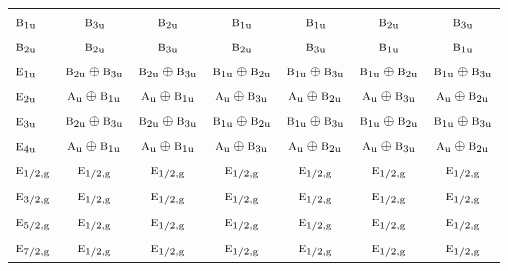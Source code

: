 \documentclass[10pt,a4paper]{article}
\numberwithin{equation}{section}
\newcommand{\irr}[1]{\text{\normalfont\scshape #1}}
\newcommand{\ptag}[1]{\mathrm{#1}}
\begin{document}
{\begin{longtable}{@{}lcccccc@{}}
$\irr{b}_{1\ptag{u}}$ & $\irr{b}_{3\ptag{u}}$ & $\irr{b}_{2\ptag{u}}$ & $\irr{b}_{1\ptag{u}}$ & $\irr{b}_{1\ptag{u}}$ & $\irr{b}_{2\ptag{u}}$ & $\irr{b}_{3\ptag{u}}$\\
$\irr{b}_{2\ptag{u}}$ & $\irr{b}_{2\ptag{u}}$ & $\irr{b}_{3\ptag{u}}$ & $\irr{b}_{2\ptag{u}}$ & $\irr{b}_{3\ptag{u}}$ & $\irr{b}_{1\ptag{u}}$ & $\irr{b}_{1\ptag{u}}$\\
$\irr{e}_{1\ptag{u}}$ & $\irr{b}_{2\ptag{u}}\oplus \irr{b}_{3\ptag{u}}$ & $\irr{b}_{2\ptag{u}}\oplus \irr{b}_{3\ptag{u}}$ & $\irr{b}_{1\ptag{u}}\oplus \irr{b}_{2\ptag{u}}$ & $\irr{b}_{1\ptag{u}}\oplus \irr{b}_{3\ptag{u}}$ & $\irr{b}_{1\ptag{u}}\oplus \irr{b}_{2\ptag{u}}$ & $\irr{b}_{1\ptag{u}}\oplus \irr{b}_{3\ptag{u}}$\\
$\irr{e}_{2\ptag{u}}$ & $\irr{a}_{\ptag{u}}\oplus \irr{b}_{1\ptag{u}}$ & $\irr{a}_{\ptag{u}}\oplus \irr{b}_{1\ptag{u}}$ & $\irr{a}_{\ptag{u}}\oplus \irr{b}_{3\ptag{u}}$ & $\irr{a}_{\ptag{u}}\oplus \irr{b}_{2\ptag{u}}$ & $\irr{a}_{\ptag{u}}\oplus \irr{b}_{3\ptag{u}}$ & $\irr{a}_{\ptag{u}}\oplus \irr{b}_{2\ptag{u}}$\\
$\irr{e}_{3\ptag{u}}$ & $\irr{b}_{2\ptag{u}}\oplus \irr{b}_{3\ptag{u}}$ & $\irr{b}_{2\ptag{u}}\oplus \irr{b}_{3\ptag{u}}$ & $\irr{b}_{1\ptag{u}}\oplus \irr{b}_{2\ptag{u}}$ & $\irr{b}_{1\ptag{u}}\oplus \irr{b}_{3\ptag{u}}$ & $\irr{b}_{1\ptag{u}}\oplus \irr{b}_{2\ptag{u}}$ & $\irr{b}_{1\ptag{u}}\oplus \irr{b}_{3\ptag{u}}$\\
$\irr{e}_{4\ptag{u}}$ & $\irr{a}_{\ptag{u}}\oplus \irr{b}_{1\ptag{u}}$ & $\irr{a}_{\ptag{u}}\oplus \irr{b}_{1\ptag{u}}$ & $\irr{a}_{\ptag{u}}\oplus \irr{b}_{3\ptag{u}}$ & $\irr{a}_{\ptag{u}}\oplus \irr{b}_{2\ptag{u}}$ & $\irr{a}_{\ptag{u}}\oplus \irr{b}_{3\ptag{u}}$ & $\irr{a}_{\ptag{u}}\oplus \irr{b}_{2\ptag{u}}$\\
$\irr{e}_{1/2,\ptag{g}}$ & $\irr{e}_{1/2,\ptag{g}}$ & $\irr{e}_{1/2,\ptag{g}}$ & $\irr{e}_{1/2,\ptag{g}}$ & $\irr{e}_{1/2,\ptag{g}}$ & $\irr{e}_{1/2,\ptag{g}}$ & $\irr{e}_{1/2,\ptag{g}}$\\
$\irr{e}_{3/2,\ptag{g}}$ & $\irr{e}_{1/2,\ptag{g}}$ & $\irr{e}_{1/2,\ptag{g}}$ & $\irr{e}_{1/2,\ptag{g}}$ & $\irr{e}_{1/2,\ptag{g}}$ & $\irr{e}_{1/2,\ptag{g}}$ & $\irr{e}_{1/2,\ptag{g}}$\\
$\irr{e}_{5/2,\ptag{g}}$ & $\irr{e}_{1/2,\ptag{g}}$ & $\irr{e}_{1/2,\ptag{g}}$ & $\irr{e}_{1/2,\ptag{g}}$ & $\irr{e}_{1/2,\ptag{g}}$ & $\irr{e}_{1/2,\ptag{g}}$ & $\irr{e}_{1/2,\ptag{g}}$\\
$\irr{e}_{7/2,\ptag{g}}$ & $\irr{e}_{1/2,\ptag{g}}$ & $\irr{e}_{1/2,\ptag{g}}$ & $\irr{e}_{1/2,\ptag{g}}$ & $\irr{e}_{1/2,\ptag{g}}$ & $\irr{e}_{1/2,\ptag{g}}$ & $\irr{e}_{1/2,\ptag{g}}$\\

\end{longtable}}
\end{document}
